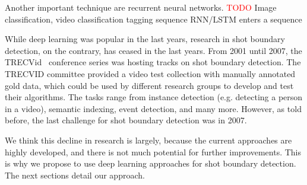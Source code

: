 Another important technique are recurrent neural networks.
\textcolor{red}{TODO}
Image classification, video classification
tagging sequence
RNN/LSTM
enters a sequence

While deep learning was popular in the last years, research in shot boundary detection, on the contrary, has ceased in the last years.
From 2001 until 2007, the TRECVid~\cite{trecvid} conference series was hosting tracks on shot boundary detection.
The TRECVID committee provided a video test collection with manually annotated gold data, which could be used by different research groups to develop and test their algorithms.
The tasks range from instance detection (e.g. detecting a person in a video), semantic indexing, event detection, and many more.
However, as told before, the last challenge for shot boundary detection was in 2007.

We think this decline in research is largely, because the current approaches are highly developed, and there is not much potential for further improvements.
This is why we propose to use deep learning approaches for shot boundary detection.
The next sections detail our approach.

